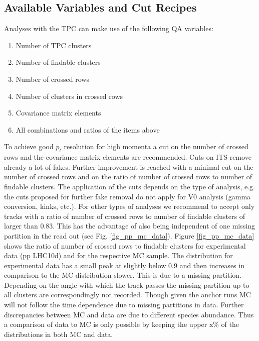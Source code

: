 \documentclass[12pt]{article}
\begin{document}
\subsection{Available Variables and Cut Recipes} \label{subsection_qavariables}
Analyses with the TPC can make use of the following QA variables:
\begin{enumerate}
\item Number of TPC clusters
\item Number of findable clusters
\item Number of crossed rows
\item Number of clusters in crossed rows
\item Covariance matrix elements
\item All combinations and ratios of the items above
\end{enumerate}

\noindent To achieve good $p_{t}$ resolution for high momenta a cut on the number of crossed rows and the covariance matrix elements are recommended. Cuts on ITS remove already a lot of fakes. Further improvement is reached with  a minimal cut on the number of crossed rows and on the ratio of number of crossed rows to number of findable clusters. The application of the cuts depends on the type of analysis, e.g. the cuts proposed for further fake removal do not apply for V0 analysis (gamma conversion, kinks, etc.).
For other types of analyses we recommend to accept only tracks with a ratio of number of crossed rows to number of findable clusters of larger than 0.83. This has the advantage of also being independent of one missing partition in the read out (see Fig. \ref{fig_pp_mc_data}). \newline 
\noindent Figure \ref{fig_pp_mc_data} shows the ratio of number of crossed rows to findable clusters for experimental data (pp LHC10d) and for the respective MC sample. The distribution for experimental data has a small peak at slightly below 0.9 and then increases in comparison to the MC distribution slower. This is due to a missing partition. Depending on the angle with which the track passes the missing partition up to all clusters are correspondingly not recorded. \newline
\noindent Though given the anchor runs MC will not follow the time dependence due to missing partitions in data. Further discrepancies between MC and data are due to different species abundance. Thus a comparison of data to MC is only possible by keeping the upper x\% of the distributions in both MC and data.
\end{document}
